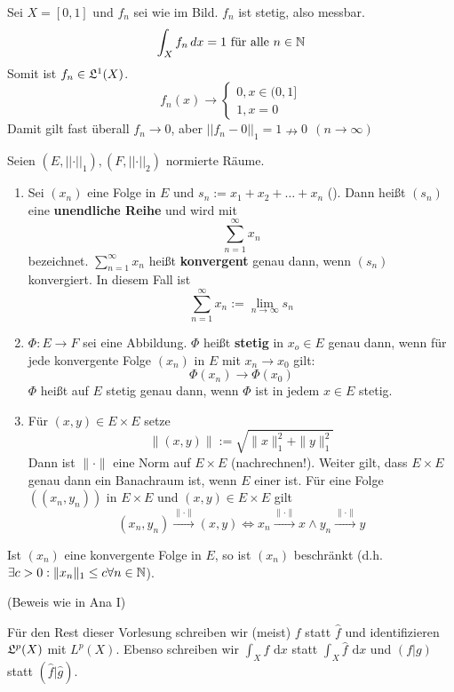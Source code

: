\documentclass[a4paper,twoside,DIV15,BCOR12mm,chapterprefix=true,headings=onelinechapter]{scrbook}
\begin{document}
\begin{beispiel}
Sei \(X=[0,1]\) und \(f_n\) sei wie im Bild. \(f_n\) ist stetig, also messbar. 
\[\int_X f_n\,dx=1 \text{ für alle } n\in\mathbb{N}\]
Somit ist \(f_n\in\mathfrak{L}^1(X)\).
\[f_n(x)\to
\begin{cases}
0, x\in(0,1]\\
1, x=0
\end{cases}\]
Damit gilt fast überall \(f_n\to0\), aber 
\(\lvert\lvert f_n-0\rvert\rvert_1=1\nrightarrow0 \ \ (n\to\infty)\)
\end{beispiel}

\begin{definition}
Seien \((E,\lvert\lvert\cdot\rvert\rvert_1), (F,\lvert\lvert\cdot\rvert\rvert_2)\) normierte Räume.
\begin{enumerate}
\item 	Sei \((x_n)\) eine Folge in $E$ und \(s_n:=x_1+x_2+\ldots+x_n\) (\natn).
 		Dann heißt \((s_n)\) eine \textbf{unendliche Reihe} und wird mit
		\[\sum^\infty_{n=1}x_n\] bezeichnet. \(\sum^\infty_{n=1}x_n\) heißt
		\textbf{konvergent} genau dann, wenn \((s_n)\) konvergiert. In diesem Fall ist
		\[\sum^\infty_{n=1}x_n:=\lim_{n\to\infty}s_n\]
\item 	\(\Phi\colon E\to F\) sei eine Abbildung. \(\Phi\) heißt \textbf{stetig} in \(x_o\in E\)
		genau dann, wenn für jede konvergente Folge \((x_n)\) in $E$ mit \(x_n\to x_0\)
		gilt: \[\Phi(x_n)\to\Phi(x_0)\] 
		\(\Phi\) heißt auf $E$ stetig genau dann, wenn \(\Phi\) ist in jedem \(x\in E\) stetig.
\item Für $(x,y)\in E\times E$ setze 
\[\|(x,y)\|:=\sqrt{\|x\|_1^2+\|y\|_1^2}\]
Dann ist $\|\cdot\|$ eine Norm auf $E\times E$ (nachrechnen!). Weiter gilt, dass $E\times E$ genau dann ein Banachraum ist, wenn $E$ einer ist. Für eine Folge $((x_n,y_n))$ in $E\times E$ und $(x,y)\in E\times E$ gilt
\[(x_n,y_n)\stackrel{\|\cdot\|}\to (x,y) \iff x_n\stackrel{\|\cdot\|}\to x \wedge y_n\stackrel{\|\cdot\|}\to y\]
\end{enumerate}
\end{definition}

\begin{bemerkung}
Ist $(x_n)$ eine konvergente Folge in $E$, so ist $(x_n)$ beschränkt (d.h. $\exists c>0: \|x_n\|_1\le c \forall n\in\mathbb{N}$).

(Beweis wie in Ana I)
\end{bemerkung}

\begin{vereinbarung}
Für den Rest dieser Vorlesung schreiben wir (meist) $f$ statt $\hat f$ und identifizieren $\mathfrak{L}^p(X)$ mit $L^p(X)$. Ebenso schreiben wir $\int_X f\text{ d}x$ statt $\int_X \hat f\text{ d}x$ und $(f|g)$ statt $(\hat f|\hat g)$.
\end{vereinbarung}
\end{document}
